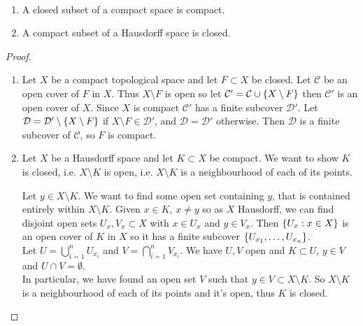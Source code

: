 \begin{lemma} \label{lem:35} ~\vspace*{-1.5\baselineskip}
    \begin{enumerate}
        \item A closed subset of a compact space is compact.
        \item A compact subset of a Hausdorff space is closed.
    \end{enumerate}
\end{lemma}  

\begin{proof}
    \begin{enumerate}
        \item Let $X$ be a compact topological space and let $F\subset X$ be closed. Let $\mathcal{C}$ be an open cover of $F$ in $X$.
        Thus $X \setminus F$ is open so let $\mathcal{C}' = \mathcal{C} \cup \{X \setminus F\}$ then $\mathcal{C}'$ is an open cover of $X$.
        Since $X$ is compact $\mathcal{C}'$ has a finite subcover $\mathcal{D}'$.
        Let $\mathcal{D} = \mathcal{D}' \setminus \{X \setminus F\}$ if $X \setminus F \in \mathcal{D}'$, and $\mathcal{D} = \mathcal{D}'$ otherwise.
        Then $\mathcal{D}$ is a finite subcover of $\mathcal{C}$, so $F$ is compact.
        
        \item Let $X$ be a Hausdorff space and let $K\subset X$ be compact. We want to show $K$ is closed, i.e. $X \setminus K$ is open, i.e. $X \setminus K$ is a neighbourhood of each of its points.
        
        Let $y\in X \setminus K$. We want to find some open set containing $y$, that is contained entirely within $X \setminus K$. Given $x\in K$, $x\neq y$ so as $X$ Hausdorff, we can find disjoint open sets $U_x, V_x\subset X$ with $x\in U_x$ and $y\in V_x$. Then $\{U_x : x\in X\}$ is an open cover of $K$ in $X$ so it has a finite subcover $\{U_{x_1}, \dots, U_{x_n}\}$. \\ 
        Let $U = \bigcup_{i=1}^n U_{x_i}$ and $V = \bigcap_{i=1}^n V_{x_i}$. 
        We have $U,V$ open and $K\subset U$, $y \in V$ and $U \cap V = \emptyset$. \\
        In particular, we have found an open set $V$ such that $y\in V\subset X \setminus K$. So $X \setminus K$ is a neighbourhood of each of its points and it's open, thus $K$ is closed.
\end{enumerate}
\end{proof}

